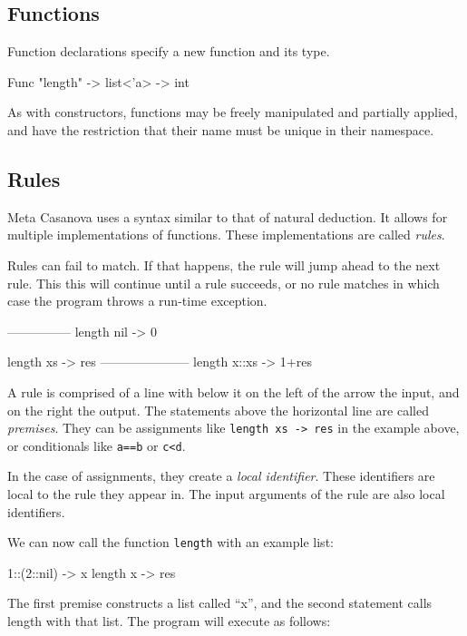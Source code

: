 \subsection{Functions}
Function declarations specify a new function and its type.

\begin{MC}
Func "length" -> list<'a> -> int
\end{MC}

As with constructors, functions may be freely manipulated and partially applied, and have the restriction that their name must be unique in their namespace.

\subsection{Rules}
Meta Casanova uses a syntax similar to that of natural deduction.
It allows for multiple implementations of functions.
These implementations are called \textit{rules}.

Rules can fail to match.
If that happens, the rule will jump ahead to the next rule.
This this will continue until a rule succeeds, or no rule matches in which case the program throws a run-time exception.

\begin{MC}
---------------
length nil -> 0

length xs -> res
---------------------
length x::xs -> 1+res
\end{MC}

A rule is comprised of a line with below it on the left of the arrow the input, and on the right the output.
The statements above the horizontal line are called \textit{premises}\label{premises}.
They can be assignments like \verb|length xs -> res| in the example above, or conditionals like \verb|a==b| or \verb|c<d|.

In the case of assignments, they create a \textit{local identifier}.
These identifiers are local to the rule they appear in.
The input arguments of the rule are also local identifiers.

We can now call the function \verb|length| with an example list:

\begin{MC}
  1::(2::nil) -> x
  length x    -> res
\end{MC}

The first premise constructs a list called ``x'', and the second statement calls length with that list.
The program will execute as follows:

